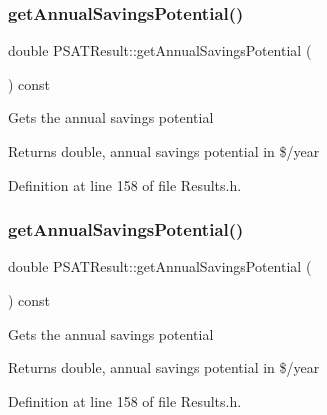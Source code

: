\subsubsection{\texorpdfstring{get\+Annual\+Savings\+Potential()}{getAnnualSavingsPotential()}\hspace{0.1cm}{\footnotesize\ttfamily [1/3]}}
{\footnotesize\ttfamily double P\+S\+A\+T\+Result\+::get\+Annual\+Savings\+Potential (\begin{DoxyParamCaption}{ }\end{DoxyParamCaption}) const\hspace{0.3cm}{\ttfamily [inline]}}

Gets the annual savings potential \begin{DoxyReturn}{Returns}
double, annual savings potential in \$/year 
\end{DoxyReturn}


Definition at line 158 of file Results.\+h.

\mbox{\label{class_p_s_a_t_result_a14fc75c2e0e92f74e3df1b97ed13b496}} 
\subsubsection{\texorpdfstring{get\+Annual\+Savings\+Potential()}{getAnnualSavingsPotential()}\hspace{0.1cm}{\footnotesize\ttfamily [2/3]}}
{\footnotesize\ttfamily double P\+S\+A\+T\+Result\+::get\+Annual\+Savings\+Potential (\begin{DoxyParamCaption}{ }\end{DoxyParamCaption}) const\hspace{0.3cm}{\ttfamily [inline]}}

Gets the annual savings potential \begin{DoxyReturn}{Returns}
double, annual savings potential in \$/year 
\end{DoxyReturn}


Definition at line 158 of file Results.\+h.

\mbox{\label{class_p_s_a_t_result_a14fc75c2e0e92f74e3df1b97ed13b496}} 
